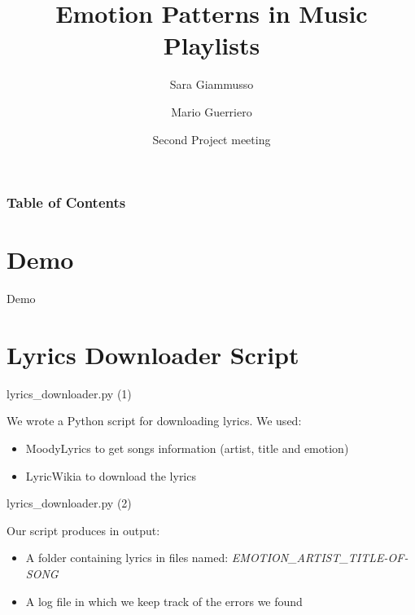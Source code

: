 \documentclass[xcolor=dvipsnames]{beamer}
\title[Emotion Patterns in Music Playlists] %
{Emotion Patterns in Music Playlists}
\author[Sara, Mario] %
{Sara Giammusso\inst{1}\inst{2} \and Mario Guerriero \inst{1}\inst{2}}
\institute[EURECOM] %
{
 \inst{1}
 MSc student in Data Science Department, EURECOM, T\'el\'ecom ParisTech, France\\
  \inst{2}%
 MSc student in Department of Control and Computer Engineering, Politecnico di Torino, Italy
}
\date[2018 March 27] %
{Second Project meeting}
\begin{document}
\frame{\titlepage}

\begin{frame}
\frametitle{Table of Contents}
\tableofcontents
\end{frame}

\section{Demo}
\begin{frame}{Demo}

\end{frame}

\section{Lyrics Downloader Script}
\begin{frame}{lyrics\_downloader.py (1)}

We wrote a Python script for downloading lyrics. We used:
\begin{itemize}
\item MoodyLyrics to get songs information (artist, title and emotion)
\item LyricWikia to download the lyrics
\end{itemize}

\end{frame}

\begin{frame}{lyrics\_downloader.py (2)}

Our script produces in output:
\begin{itemize}
\item A folder containing lyrics in files named: \textit{EMOTION\_ARTIST\_TITLE-OF-SONG}
\item A log file in which we keep track of the errors we found
\end{itemize}

\end{frame}

\end{document}
